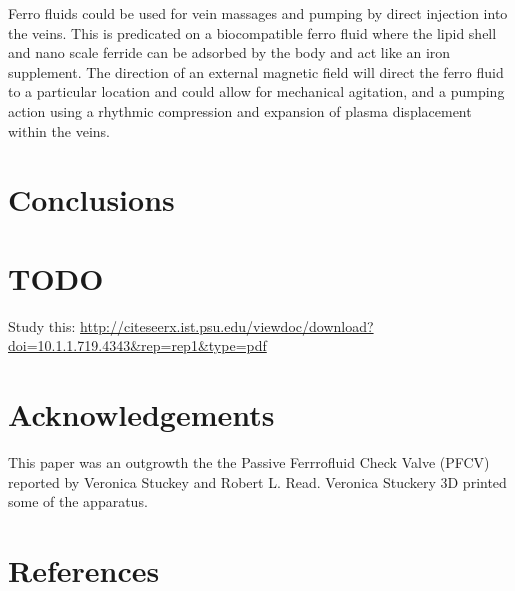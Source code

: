 \documentclass[12pt]{article}
\begin{document}
Ferro fluids could be used for vein massages and pumping by direct injection into the veins. This is predicated on a biocompatible ferro fluid where the lipid shell and nano scale ferride can be adsorbed by the body and act like an iron supplement. The direction of an external magnetic field will direct the ferro fluid to a particular location and could allow for mechanical agitation, and a pumping action using a rhythmic compression and expansion of plasma displacement within the veins.

\section{Conclusions}

\section{TODO}

Study this: \url{http://citeseerx.ist.psu.edu/viewdoc/download?doi=10.1.1.719.4343&rep=rep1&type=pdf}

\section{Acknowledgements}

This paper was an outgrowth the the Passive Ferrrofluid Check Valve (PFCV) \cite{stuckeynovel}
reported by Veronica Stuckey and Robert L. Read. Veronica Stuckery 3D printed
some of the apparatus.

\section*{References}



\end{document}

